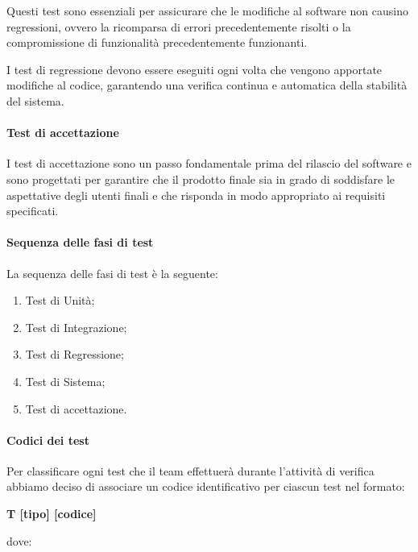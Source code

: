 Questi test sono essenziali per assicurare che le modifiche al software non causino regressioni, ovvero la ricomparsa di errori precedentemente risolti o la compromissione di funzionalità precedentemente funzionanti.

I test di regressione devono essere eseguiti ogni volta che vengono apportate modifiche al codice, garantendo una verifica continua e automatica della stabilità del sistema.

\paragraph{Test di accettazione}
I test di accettazione sono un passo fondamentale prima del rilascio del software e sono progettati per garantire che il prodotto finale sia in grado di soddisfare le aspettative degli utenti finali e che risponda in modo appropriato ai requisiti specificati.

\paragraph{Sequenza delle fasi di test}
La sequenza delle fasi di test è la seguente:

\begin{enumerate}
    \item Test di Unità;
    \item Test di Integrazione;
    \item Test di Regressione;
    \item Test di Sistema;
    \item Test di accettazione.
\end{enumerate}

\paragraph{Codici dei test}
Per classificare ogni test che il team effettuerà durante l'attività di verifica abbiamo deciso di associare un codice identificativo per ciascun test nel formato:

\begin{center}
    \textbf{T [tipo] [codice]}
\end{center}

dove:

